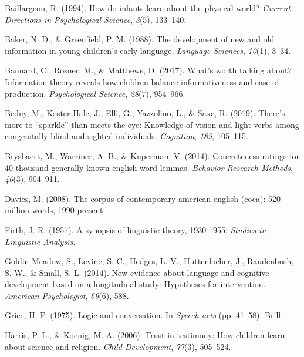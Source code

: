 \documentclass[10pt, letterpaper]{article}
\newlength{\cslhangindent}
\newenvironment{cslreferences}%
  {\setlength{\parindent}{0pt}%
  \everypar{\setlength{\hangindent}{\cslhangindent}}\ignorespaces}%
  {\par}
\begin{document}
\setlength{\parindent}{-0.1in} 
\setlength{\leftskip}{0.125in}

\noindent

\hypertarget{refs}{}
\begin{cslreferences}
\leavevmode\hypertarget{ref-baillargeon1994}{}%
Baillargeon, R. (1994). How do infants learn about the physical world?
\emph{Current Directions in Psychological Science}, \emph{3}(5),
133--140.

\leavevmode\hypertarget{ref-baker1988}{}%
Baker, N. D., \& Greenfield, P. M. (1988). The development of new and
old information in young children's early language. \emph{Language
Sciences}, \emph{10}(1), 3--34.

\leavevmode\hypertarget{ref-bannard2017}{}%
Bannard, C., Rosner, M., \& Matthews, D. (2017). What's worth talking
about? Information theory reveals how children balance informativeness
and ease of production. \emph{Psychological Science}, \emph{28}(7),
954--966.

\leavevmode\hypertarget{ref-bedny2019}{}%
Bedny, M., Koster-Hale, J., Elli, G., Yazzolino, L., \& Saxe, R. (2019).
There's more to ``sparkle'' than meets the eye: Knowledge of vision and
light verbs among congenitally blind and sighted individuals.
\emph{Cognition}, \emph{189}, 105--115.

\leavevmode\hypertarget{ref-brysbaert2014}{}%
Brysbaert, M., Warriner, A. B., \& Kuperman, V. (2014). Concreteness
ratings for 40 thousand generally known english word lemmas.
\emph{Behavior Research Methods}, \emph{46}(3), 904--911.

\leavevmode\hypertarget{ref-davies2008}{}%
Davies, M. (2008). The corpus of contemporary american english (coca):
520 million words, 1990-present.

\leavevmode\hypertarget{ref-firth1957}{}%
Firth, J. R. (1957). A synopsis of linguistic theory, 1930-1955.
\emph{Studies in Linguistic Analysis}.

\leavevmode\hypertarget{ref-goldin-meadow2014}{}%
Goldin-Meadow, S., Levine, S. C., Hedges, L. V., Huttenlocher, J.,
Raudenbush, S. W., \& Small, S. L. (2014). New evidence about language
and cognitive development based on a longitudinal study: Hypotheses for
intervention. \emph{American Psychologist}, \emph{69}(6), 588.

\leavevmode\hypertarget{ref-grice1975}{}%
Grice, H. P. (1975). Logic and conversation. In \emph{Speech acts} (pp.
41--58). Brill.

\leavevmode\hypertarget{ref-harris2006}{}%
Harris, P. L., \& Koenig, M. A. (2006). Trust in testimony: How children
learn about science and religion. \emph{Child Development},
\emph{77}(3), 505--524.


\end{cslreferences}
\end{document}
